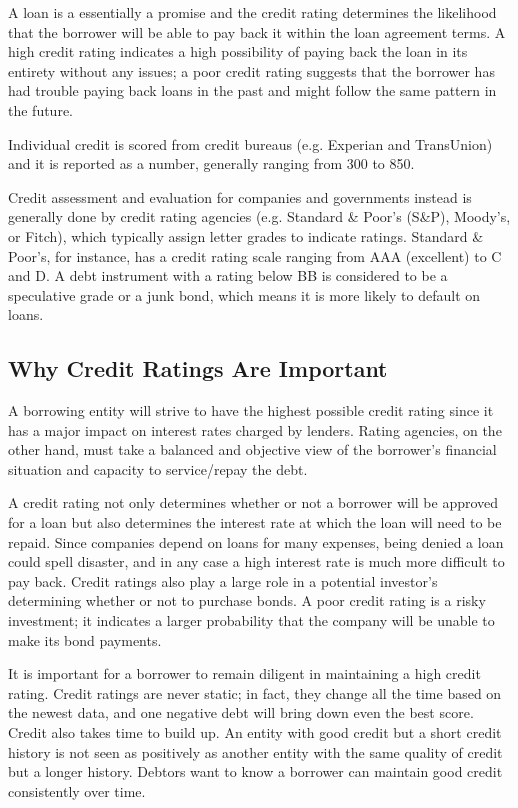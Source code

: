 A loan is a essentially a promise and the credit rating determines the
likelihood that the borrower will be able to pay back it within the loan
agreement terms. A high credit rating indicates a high possibility of
paying back the loan in its entirety without any issues; a poor credit
rating suggests that the borrower has had trouble paying back loans in
the past and might follow the same pattern in the future.

Individual credit is scored from credit bureaus (e.g. Experian and
TransUnion) and it is reported as a number, generally ranging from 300
to 850.

Credit assessment and evaluation for companies and governments instead
is generally done by credit rating agencies (e.g. Standard \& Poor's
(S\&P), Moody's, or Fitch), which typically assign letter grades to
indicate ratings. Standard \& Poor's, for instance, has a credit rating
scale ranging from AAA (excellent) to C and D. A debt instrument with a
rating below BB is considered to be a speculative grade or a junk bond,
which means it is more likely to default on loans.

\subsection{Why Credit Ratings Are Important}\label{why-credit-ratings-are-important}

A borrowing entity will strive to have the highest possible credit
rating since it has a major impact on interest rates charged by lenders.
Rating agencies, on the other hand, must take a balanced and objective
view of the borrower's financial situation and capacity to service/repay
the debt.

A credit rating not only determines whether or not a borrower will be
approved for a loan but also determines the interest rate at which the
loan will need to be repaid. Since companies depend on loans for many
expenses, being denied a loan could spell disaster, and
in any case a high interest rate is much more difficult to pay back.
Credit ratings also play a large role in a potential investor's
determining whether or not to purchase bonds. A poor credit rating is a
risky investment; it indicates a larger probability that the company
will be unable to make its bond payments.

It is important for a borrower to remain diligent in maintaining a high
credit rating. Credit ratings are never static; in fact, they change all
the time based on the newest data, and one negative debt will bring down
even the best score. 
Credit also takes time to build up. An entity with
good credit but a short credit history is not seen as positively as
another entity with the same quality of credit but a longer history.
Debtors want to know a borrower can maintain good credit consistently
over time.

